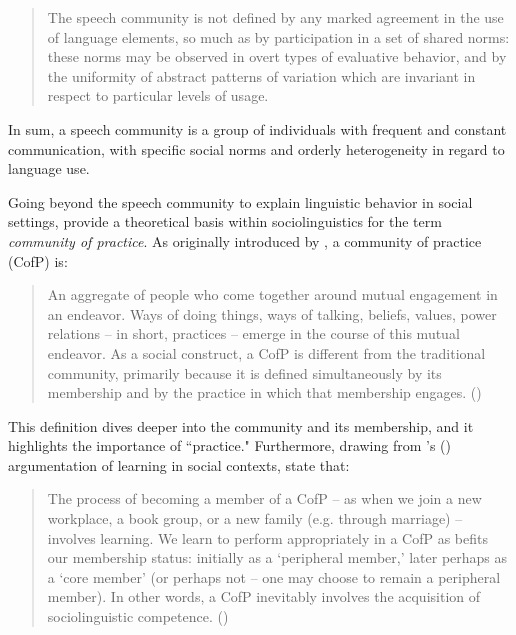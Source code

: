 \documentclass[output=paper,colorlinks,citecolor=brown,
]{langscibook}
\begin{document}
\begin{quote}
The speech community is not defined by any marked agreement in the use of language elements, so much as by participation in a set of shared norms: these norms may be observed in overt types of evaluative behavior, and by the uniformity of abstract patterns of variation which are invariant in respect to particular levels of usage. \citep[120--1]{labov1972sociolinguistic}

\end{quote}

\noindent In sum, a speech community is a group of individuals with frequent and constant communication, with specific social norms and orderly heterogeneity in regard to language use.


Going beyond the speech community to explain linguistic behavior in social settings, \citet{holmes1999community} provide a theoretical basis within sociolinguistics for the term \textit{community of practice}. As originally introduced by \citet{eckert1992think}, a community of practice (CofP) is:

\begin{quote}
    An aggregate of people who come together around mutual engagement in an endeavor. Ways of doing things, ways of talking, beliefs, values, power relations -- in short, practices -- emerge in the course of this mutual endeavor. As a social construct, a CofP is different from the traditional community, primarily because it is defined simultaneously by its membership and by the practice in which that membership engages. (\citeyear[464]{eckert1992think})
\end{quote}

\noindent This definition dives deeper into the community and its membership, and it highlights the importance of ``practice." Furthermore, drawing from \citeauthor{wenger1998communities}'s (\citeyear{wenger1998communities}) argumentation of learning in social contexts, \citeauthor{holmes1999community} state that:

\begin{quote}
    The process of becoming a member of a CofP -- as when we join a new workplace, a book group, or a new family (e.g. through marriage) -- involves learning. We learn to perform appropriately in a CofP as befits our membership status: initially as a `peripheral member,' later perhaps as a `core member' (or perhaps not -- one may choose to remain a peripheral member). In other words, a CofP inevitably involves the acquisition of sociolinguistic competence. (\citeyear[174]{holmes1999community})
\end{quote}
\end{document}

